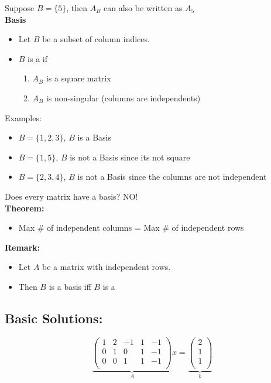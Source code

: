 \documentclass[letterpaper, 12pt]{article}
\newcommand{\red}[1]{{\color{red}{#1}}}
\begin{document}
    Suppose $B = \{5\}$, then $A_B$ can also be written as $A_5$\\
    \bigskip
    \textbf{Basis}\\
    \begin{itemize}
        \item Let $B$ be a subset of column indices.
        \item $B$ is a \red{basis} if\\
        \begin{enumerate}
            \item $A_B$ is a square matrix
            \item $A_B$ is non-singular (columns are independents)
        \end{enumerate}
    \end{itemize}
    Examples:\\
    \begin{itemize}
        \item $B = \{1, 2, 3\}$, $B$ is a Basis
        \item $B = \{1, 5\}$, $B$ is not a Basis since its not square
        \item $B = \{2, 3, 4\}$, $B$ is not a Basis since the columns are not independent
    \end{itemize}

    Does every matrix have a basis? NO!\\
    \pagebreak
    \textbf{Theorem:}\\
    \begin{itemize}
        \item Max \# of independent columns = Max \# of independent rows
    \end{itemize}
    \textbf{Remark:}\\
    \begin{itemize}
        \item Let $A$ be a matrix with independent rows.
        \item Then $B$ is a basis iff $B$ is a \red{maximal set of independent columns of $A$}
    \end{itemize}

    \subsection{Basic Solutions:}
    $$\underbrace{
        \begin{pmatrix}
            1 & 2 & -1 & 1 & -1\\
            0 & 1 & 0 & 1 & -1\\
            0 & 0 & 1 & 1 & -1\\
        \end{pmatrix}
    }_{A} x =  \underbrace{\begin{pmatrix}
        2\\
        1\\
        1\\
    \end{pmatrix}}_{b}$$
\end{document}
